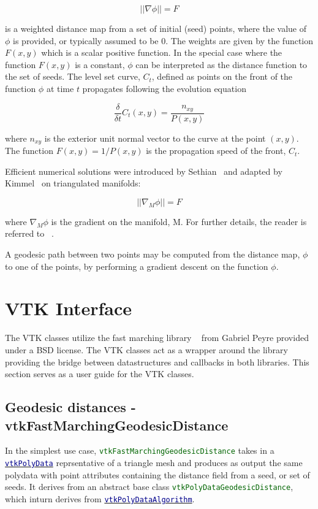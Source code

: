 \documentclass{InsightArticle}
\def\code#1{\small\textcolor{darkgreen}{\texttt{#1}}}
\def\vtk#1{\href{www.vtk.org/doc/nightly/html/class#1.html}{\small\textcolor{darkblue}{\texttt{#1}}}}
\begin{document}
\begin{equation}
  \left|\left|\nabla \phi \right|\right| = F
\label{eq:Eikonal}
\end{equation}

is a weighted distance map from a set of initial (seed) points, where the value of $\phi$ is provided, or typically assumed to be 0. The weights are given by the function $F(x,y)$ which is a scalar positive function. In the special case where the function $F(x,y)$ is a constant, $\phi$ can be interpreted as the distance function to the set of seeds. The level set curve, $C_t$, defined as points on the front of the function $\phi$ at time $t$ propagates following the evolution equation

\begin{equation}
  \frac{\delta}{\delta t}C_t(x,y) = \frac{n_{xy}}{P(x,y)}
\label{eq:LevelSet}
\end{equation}

where $n_{xy}$ is the exterior unit normal vector to the curve at the point $(x,y)$. The function $F(x,y) = 1/P(x,y)$ is the propagation speed of the front, $C_t$.

Efficient numerical solutions were introduced by Sethian~\cite{Sethian98} and adapted by Kimmel~\cite{Kimmel98} on triangulated manifolds:

\begin{equation}
  \left|\left|\nabla_M \phi \right|\right| = F
\label{eq:EikonalOnManifolds}
\end{equation}

where $\nabla_M \phi$ is the gradient on the manifold, M. For further details, the reader is referred to ~\cite{Sethian98,Kimmel98,Peyre06}.

A geodesic path between two points may be computed from the distance map, $\phi$ to one of the points, by performing a gradient descent on the function $\phi$.

\section{VTK Interface}

The VTK classes utilize the fast marching library ~\cite{PeyreCode} from Gabriel Peyre provided under a BSD license. The VTK classes act as a wrapper around the library providing the bridge between datastructures and callbacks in both libraries. This section serves as a user guide for the VTK classes. 

\subsection{Geodesic distances - vtkFastMarchingGeodesicDistance}
In the simplest use case, \code{vtkFastMarchingGeodesicDistance} takes in a \vtk{vtkPolyData} reprsentative of a triangle mesh and produces as output the same polydata with point attributes containing the distance field from a seed, or set of seeds.
It derives from an abstract base class \code{vtkPolyDataGeodesicDistance}, which inturn derives from \vtk{vtkPolyDataAlgorithm}.
\end{document}
